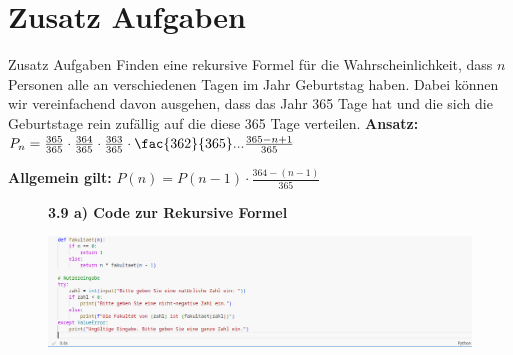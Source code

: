 \documentclass{beamer}
\begin{document}
\section{Zusatz Aufgaben}

\begin{frame}{Zusatz Aufgaben}
     Finden eine rekursive Formel für die Wahrscheinlichkeit, dass $n$ Personen alle an
verschiedenen Tagen im Jahr Geburtstag haben.  Dabei können wir vereinfachend davon ausgehen,
dass das Jahr 365 Tage hat und die sich die Geburtstage rein zufällig auf die diese 365 Tage
verteilen.  \newline 
\textbf{Ansatz:} $P_{n} = \frac{365}{365} \cdot \frac{364}{365} \cdot \frac{363}{365} \cdot \fac{362}{365} ... \frac{365 - n + 1}{365} $ 

\newline 
\textbf{Allgemein gilt:} $P(n)  = P(n- 1) \cdot \frac{364 - (n -1)}{365}$
\end{frame}



\begin{frame}%
\begin{figure}
\noindent \textbf{3.9 a) Code zur Rekursive Formel} \\
    \begin{center}
    \includegraphics[width=1.8\textwidth]{code/aufg3.9a.png}
    \end{center}
\end{figure}
\end{frame}
\end{document}
